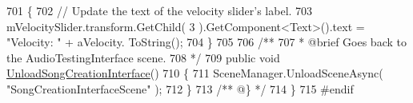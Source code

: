 \begin{DoxyCodeInclude}
701     \{
702         \textcolor{comment}{// Update the text of the velocity slider's label.}
703         mVelocitySlider.transform.GetChild( 3 ).GetComponent<Text>().text = \textcolor{stringliteral}{"Velocity: "} + aVelocity.
      ToString();
704     \}
705 \textcolor{comment}{}
706 \textcolor{comment}{    /**}
707 \textcolor{comment}{     * @brief Goes back to the AudioTestingInterface scene.}
708 \textcolor{comment}{    */}
709     \textcolor{keyword}{public} \textcolor{keywordtype}{void} \hyperlink{group___s_c_m_handlers_gac39b0d849c680dda1e047c3e7d848b51}{UnloadSongCreationInterface}()
710     \{
711         SceneManager.UnloadSceneAsync( \textcolor{stringliteral}{"SongCreationInterfaceScene"} );
712     \}\textcolor{comment}{}
713 \textcolor{comment}{    /** @\} */}
714 \}
715 \textcolor{preprocessor}{#endif}
\end{DoxyCodeInclude}
 
